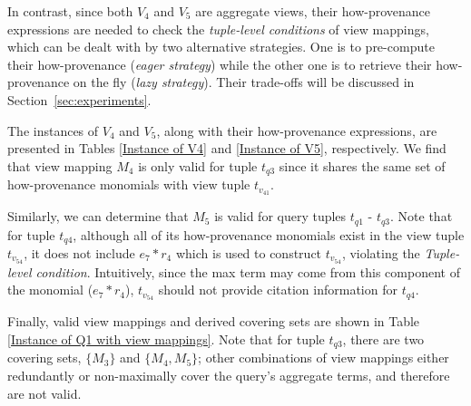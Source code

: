 \begin{example}


In contrast, since both $V_4$ and $V_5$ are aggregate views, their how-provenance expressions are needed to check the \textit{tuple-level conditions} of view mappings, which can be dealt with by two alternative strategies. One is to pre-compute their how-provenance ({\em eager strategy}) while the other one is to retrieve their how-provenance on the fly ({\em lazy strategy}). Their trade-offs will be discussed in Section~\ref{sec:experiments}.

The instances of $V_4$ and $V_5$, along with their how-provenance expressions, are presented in Tables \ref{Instance of V4} and  \ref{Instance of V5}, respectively. We find that view mapping $M_4$ is only valid for tuple $t_{q3}$ since it shares the same set of how-provenance monomials with view tuple $t_{v_41}$.

Similarly, we can determine that $M_5$ is valid for query tuples $t_{q1}$ - $t_{q3}$. Note that for tuple $t_{q4}$, although all of its how-provenance monomials exist in the view tuple $t_{v_54}$, it does not include
$e_7*r_4$ which is used to construct $t_{v_54}$, violating the {\em Tuple-level condition}.  Intuitively, since the max term may come from this component of the monomial ($e_7*r_4$), $t_{v_54}$ should not provide citation information for $t_{q4}$.


Finally, valid view mappings and derived covering sets are shown in Table \ref{Instance of Q1 with view mappings}. Note that for tuple $t_{{q}3}$, there are two covering sets, $\{M_3\}$ and $\{M_4, M_5\}$;  
other combinations of view mappings either {redundantly} or {non-maximally} cover the query's aggregate terms, and therefore are not valid.

\end{example}



